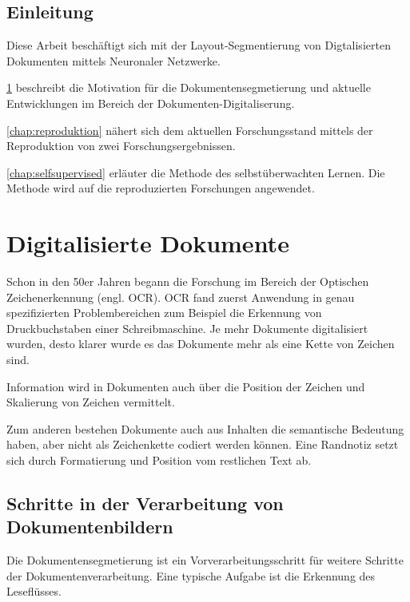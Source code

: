 

\section*{Einleitung}
Diese Arbeit beschäftigt sich mit der Layout-Segmentierung von Digtalisierten Dokumenten mittels Neuronaler Netzwerke.

\cref{chap:documents} beschreibt die Motivation für die Dokumentensegmetierung und aktuelle Entwicklungen im
Bereich der Dokumenten-Digitaliserung.

\cref{chap:reproduktion} nähert sich dem aktuellen Forschungsstand mittels der Reproduktion von zwei Forschungsergebnissen.

\cref{chap:selfsupervised} erläuter die Methode des selbstüberwachten Lernen. Die Methode wird auf die reproduzierten Forschungen angewendet.

\chapter{Digitalisierte Dokumente}
\label{chap:documents}


% 
Schon in den 50er Jahren begann die Forschung im Bereich der Optischen Zeichenerkennung 
(engl. OCR)\autocite{DoermannHandbookdocumentimage2014}. OCR fand zuerst Anwendung in genau 
spezifizierten Problembereichen zum Beispiel die Erkennung von Druckbuchstaben einer Schreibmaschine. 
Je mehr Dokumente digitalisiert wurden, desto klarer wurde es das Dokumente mehr als 
eine Kette von Zeichen sind. 


Information wird in Dokumenten auch über die Position der Zeichen und Skalierung von Zeichen vermittelt.

Zum anderen bestehen Dokumente auch aus Inhalten die semantische Bedeutung haben, aber nicht als
Zeichenkette codiert werden können. 
Eine Randnotiz setzt sich durch Formatierung und Position vom restlichen Text ab. 


\section{Schritte in der Verarbeitung von Dokumentenbildern}
Die Dokumentensegmetierung ist ein Vorverarbeitungsschritt für weitere Schritte der Dokumentenverarbeitung.
Eine typische Aufgabe ist die Erkennung des Leseflüsses.

